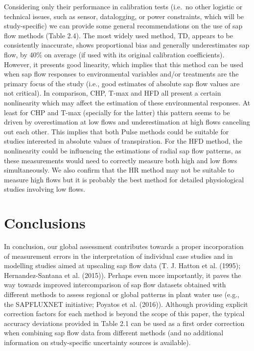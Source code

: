\documentclass[11pt,twoside]{reedthesis}
\begin{document}
Considering only their performance in calibration tests (i.e.~no other
logistic or technical issues, such as sensor, datalogging, or power
constraints, which will be study-specific) we can provide some general
recommendations on the use of sap flow methods (Table 2.4). The most
widely used method, TD, appears to be consistently inaccurate, shows
proportional bias and generally underestimates sap flow, by 40\% on
average (if used with its original calibration coefficients). However,
it presents good linearity, which implies that this method can be used
when sap flow responses to environmental variables and/or treatments are
the primary focus of the study (i.e., good estimates of absolute sap
flow values are not critical). In comparison, CHP, T-max and HFD all
present a certain nonlinearity which may affect the estimation of these
environmental responses. At least for CHP and T-max (specially for the
latter) this pattern seems to be driven by overestimation at low flows
and underestimation at high flows canceling out each other. This implies
that both Pulse methods could be suitable for studies interested in
absolute values of transpiration. For the HFD method, the nonlinearity
could be influencing the estimations of radial sap flow patterns, as
these measurements would need to correctly measure both high and low
flows simultaneously. We also confirm that the HR method may not be
suitable to measure high flows but it is probably the best method for
detailed physiological studies involving low flows.\par

\section{Conclusions}\label{conclusions}

In conclusion, our global assessment contributes towards a proper
incorporation of measurement errors in the interpretation of individual
case studies and in modelling studies aimed at upscaling sap flow data
(T. J. Hatton et al. (1995); Hernandez-Santana et al. (2015)). Perhaps
even more importantly, it paves the way towards improved intercomparison
of sap flow datasets obtained with different methods to assess regional
or global patterns in plant water use (e.g., the SAPFLUXNET initiative;
Poyatos et al. (2016)). Although providing explicit correction factors
for each method is beyond the scope of this paper, the typical accuracy
deviations provided in Table 2.1 can be used as a first order correction
when combining sap flow data from different methods (and no additional
information on study-specific uncertainty sources is available).\par
\end{document}
